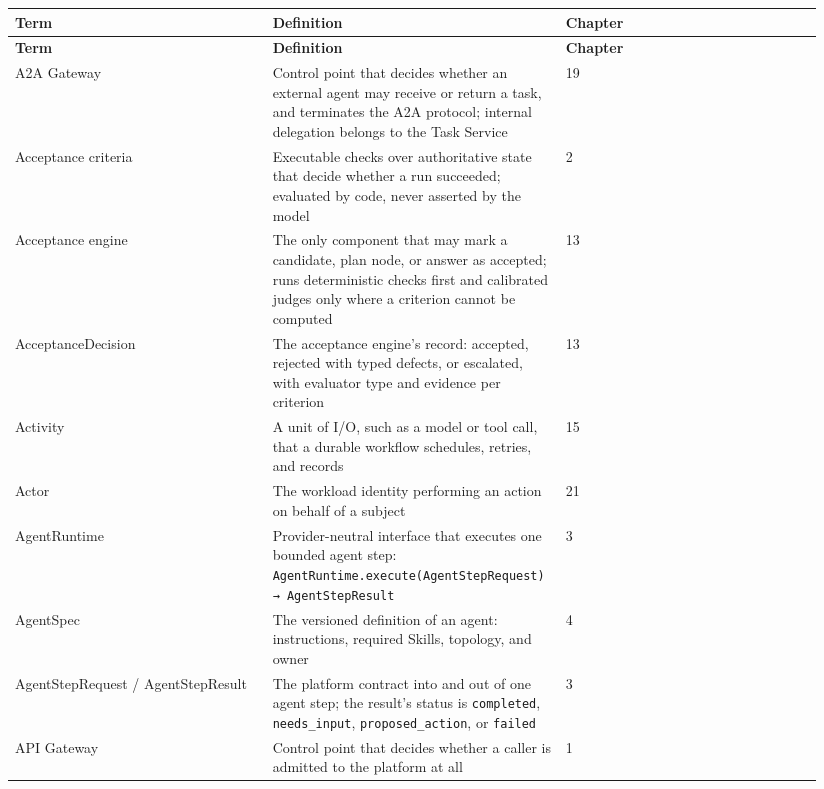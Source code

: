 \BookTableStart
\small
\begin{longtable}{@{}Y{0.3133\linewidth}Y{0.3133\linewidth}Y{0.3133\linewidth}@{}}
\color{white}\bfseries \textbf{Term} & \color{white}\bfseries \textbf{Definition} & \color{white}\bfseries \textbf{Chapter} \\
\endfirsthead
{}
\color{white}\bfseries \textbf{Term} & \color{white}\bfseries \textbf{Definition} & \color{white}\bfseries \textbf{Chapter} \\
\endhead
A2A Gateway & Control point that decides whether an external agent may receive or return a task, and terminates the A2A protocol; internal delegation belongs to the Task Service & 19 \\
Acceptance criteria & Executable checks over authoritative state that decide whether a run succeeded; evaluated by code, never asserted by the model & 2 \\
Acceptance engine & The only component that may mark a candidate, plan node, or answer as accepted; runs deterministic checks first and calibrated judges only where a criterion cannot be computed & 13 \\
AcceptanceDecision & The acceptance engine's record: accepted, rejected with typed defects, or escalated, with evaluator type and evidence per criterion & 13 \\
Activity & A unit of I/O, such as a model or tool call, that a durable workflow schedules, retries, and records & 15 \\
Actor & The workload identity performing an action on behalf of a subject & 21 \\
AgentRuntime & Provider-neutral interface that executes one bounded agent step: \lstinline[style=bookinline]!AgentRuntime.execute(AgentStepRequest) → AgentStepResult! & 3 \\
AgentSpec & The versioned definition of an agent: instructions, required Skills, topology, and owner & 4 \\
AgentStepRequest / AgentStepResult & The platform contract into and out of one agent step; the result's status is \lstinline[style=bookinline]!completed!, \lstinline[style=bookinline]!needs_input!, \lstinline[style=bookinline]!proposed_action!, or \lstinline[style=bookinline]!failed! & 3 \\
API Gateway & Control point that decides whether a caller is admitted to the platform at all & 1 \\

\end{longtable}
